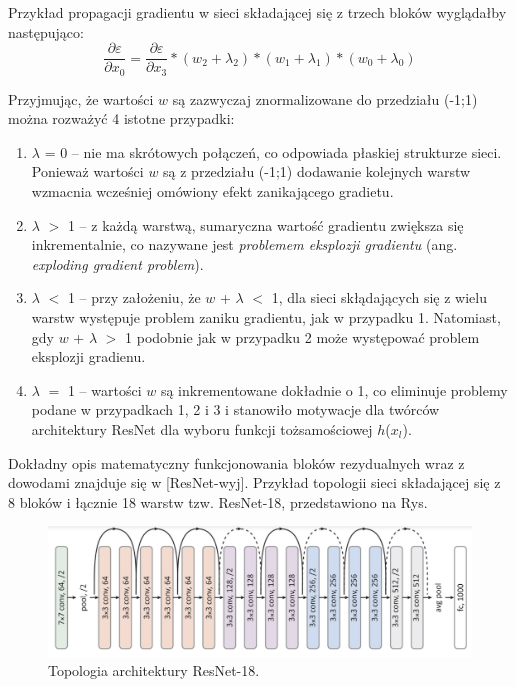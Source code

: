 Przykład propagacji gradientu w sieci składającej się z trzech bloków wyglądałby następująco:
\begin{equation}
\frac{\partial \varepsilon}{\partial x_0} =  \frac{\partial \varepsilon}{\partial x_3}*(w_2+\lambda_2)*(w_1+\lambda_1)*(w_0+\lambda_0)
\end{equation}

Przyjmując, że wartości $w$ są zazwyczaj znormalizowane do przedziału (-1;1) można rozważyć 4 istotne przypadki:
\begin{enumerate}
	\item $\lambda$ = 0 -- nie ma skrótowych połączeń, co odpowiada płaskiej strukturze sieci. Ponieważ wartości $w$ są z przedziału (-1;1) dodawanie kolejnych warstw wzmacnia wcześniej omówiony efekt zanikającego gradietu.
	\item $\lambda$ $>$ 1 -- z każdą warstwą, sumaryczna wartość gradientu zwiększa się inkrementalnie, co nazywane jest \textit{problemem eksplozji gradientu} (ang. \textit{exploding gradient problem}).
	\item $\lambda$ $<$ 1 -- przy założeniu, że $w$ + $\lambda$ $<$ 1, dla sieci skłądających się z wielu warstw występuje problem zaniku gradientu, jak w przypadku 1. Natomiast, gdy $w$ + $\lambda$ $>$ 1 podobnie jak w przypadku 2 może występować problem eksplozji gradienu.
	\item $\lambda$ $=$ 1 -- wartości $w$ są inkrementowane dokładnie o 1, co eliminuje problemy podane w przypadkach 1, 2 i 3 i stanowiło motywacje dla twórców architektury ResNet dla wyboru funkcji tożsamościowej $h$($x_l$).
\end{enumerate}

Dokładny opis matematyczny funkcjonowania bloków rezydualnych wraz z dowodami znajduje się w [ResNet-wyj]. Przykład topologii sieci składającej się z 8 bloków i łącznie 18 warstw tzw. ResNet-18, przedstawiono na Rys.
\begin{figure}[h!]
	\centering
	\includegraphics[width=1\textwidth]{figures/ResNet.png}
	\caption{Topologia architektury ResNet-18.}
	\label{ResNetBlock}
\end{figure} 

